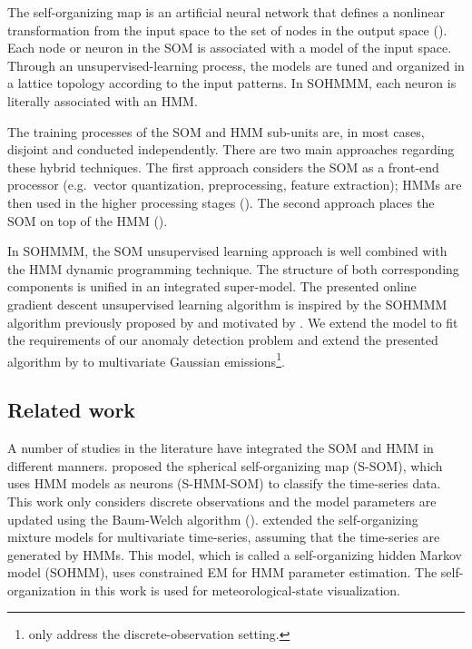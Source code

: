 The self-organizing map is an artificial neural network that defines a nonlinear transformation from the input space to the set of nodes in the output space (\citet{Somervuo2000}). Each node or neuron in the SOM is associated with a model of the input space. Through an unsupervised-learning process, the models are tuned and organized in a lattice topology according to the input patterns. In SOHMMM, each neuron is literally associated with an HMM.

The training processes of the SOM and HMM sub-units are, in most cases, disjoint and conducted independently. There are two main approaches regarding these hybrid techniques. The first approach considers the SOM as a front-end processor (e.g.\ vector quantization, preprocessing, feature extraction); HMMs are then used in the higher processing stages (\citet{Somervuo2000,Kurimo1996,Morimoto2016}). The second approach places the SOM on top of the HMM (\citet{Ferles2013,Ferles2013b,Lebbah2015}).

In SOHMMM, the SOM unsupervised learning approach is well combined with the HMM dynamic programming technique. The structure of both corresponding components is unified in an integrated super-model. The presented online gradient descent unsupervised learning algorithm is inspired by the SOHMMM algorithm previously proposed by \citet{Ferles2013} and motivated by \citet{Baldi1994}. We extend the model to fit the requirements of our anomaly detection problem and extend the presented algorithm by \citet{Ferles2013} to multivariate Gaussian emissions\footnote{\citet{Ferles2013} only address the discrete-observation setting.}.

\subsection{Related work}
A number of studies in the literature have integrated the SOM and HMM in different manners. \citet{Gen2012} proposed the spherical self-organizing map (S-SOM), which uses HMM models as neurons (S-HMM-SOM) to classify the time-series data. This work only considers discrete observations and the model parameters are updated using the Baum-Welch algorithm (\citet{Baum1972}). \citet{Yamaguchi2010} extended the self-organizing mixture models for multivariate time-series, assuming that the time-series are generated by HMMs. This model, which is called a self-organizing hidden Markov model (SOHMM), uses constrained EM for HMM parameter estimation. The self-organization in this work is used for meteorological-state visualization.

